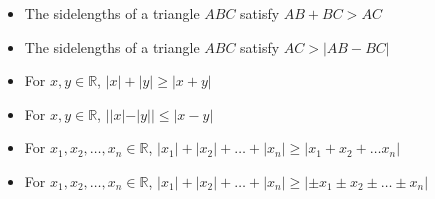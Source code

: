 \documentclass[12pt]{article}
\theoremstyle{definition}
\begin{document}
\begin{itemize}
    \item The sidelengths of a triangle $ABC$ satisfy $AB+BC > AC$
    \item The sidelengths of a triangle $ABC$ satisfy $AC > |AB-BC|$
    \item For $x,y\in\mathbb{R}$, $|x|+|y|\geq |x+y|$
    \item For $x,y\in\mathbb{R}$, $||x|-|y||\leq |x-y|$
    \item For $x_{1},x_{2},\dots,x_{n} \in\mathbb{R}$, $|x_{1}|+|x_{2}|+\dots+|x_{n}|\geq |x_{1}+x_{2}+\dots x_{n}|$
    \item For $x_{1},x_{2},\dots,x_{n} \in\mathbb{R}$, $|x_{1}|+|x_{2}|+\dots+|x_{n}|\geq |\pm x_{1}\pm x_{2}\pm \dots\pm x_{n}|$
\end{itemize}
\end{document}
